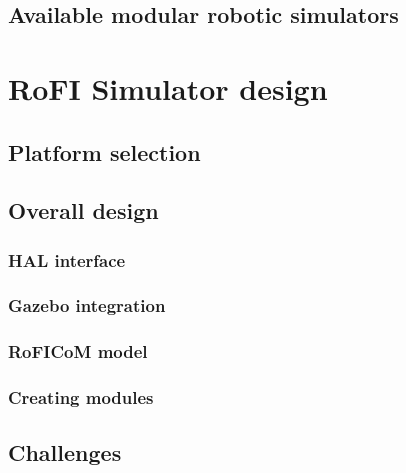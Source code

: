\documentclass[
  digital, %
  table,   %
  oneside, %
  nolof,     %
  nolot,     %
]{fithesis3}
\begin{document}
\section{Available modular robotic simulators}


\chapter{RoFI Simulator design}

\section{Platform selection}


\section{Overall design}



\subsection{HAL interface}

\subsection{Gazebo integration}

\subsection{RoFICoM model}

\subsection{Creating modules}

\section{Challenges}
\end{document}
